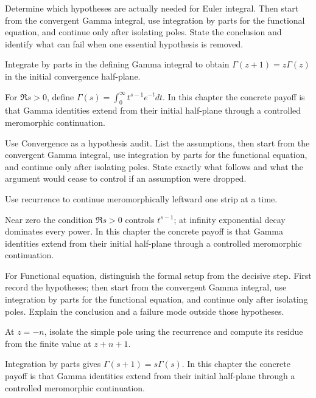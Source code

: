 \begin{exercise}\label{exr:iv19-01}
Determine which hypotheses are actually needed for Euler integral. Then start from the convergent Gamma integral, use integration by parts for the functional equation, and continue only after isolating poles. State the conclusion and identify what can fail when one essential hypothesis is removed.
\end{exercise}
\begin{hint}
Integrate by parts in the defining Gamma integral to obtain \(\Gamma(z+1)=z\Gamma(z)\) in the initial convergence half-plane.
\end{hint}
\begin{solution}
For $\Re s>0$, define $\Gamma(s)=\int_0^\infty t^{s-1}e^{-t}dt$. In this chapter the concrete payoff is that Gamma identities extend from their initial half-plane through a controlled meromorphic continuation.
\end{solution}

\begin{exercise}\label{exr:iv19-02}
Use Convergence as a hypothesis audit. List the assumptions, then start from the convergent Gamma integral, use integration by parts for the functional equation, and continue only after isolating poles. State exactly what follows and what the argument would cease to control if an assumption were dropped.
\end{exercise}
\begin{hint}
Use recurrence to continue meromorphically leftward one strip at a time.
\end{hint}
\begin{solution}
Near zero the condition $\Re s>0$ controls $t^{s-1}$; at infinity exponential decay dominates every power. In this chapter the concrete payoff is that Gamma identities extend from their initial half-plane through a controlled meromorphic continuation.
\end{solution}

\begin{exercise}\label{exr:iv19-03}
For Functional equation, distinguish the formal setup from the decisive step. First record the hypotheses; then start from the convergent Gamma integral, use integration by parts for the functional equation, and continue only after isolating poles. Explain the conclusion and a failure mode outside those hypotheses.
\end{exercise}
\begin{hint}
At \(z=-n\), isolate the simple pole using the recurrence and compute its residue from the finite value at \(z+n+1\).
\end{hint}
\begin{solution}
Integration by parts gives $\Gamma(s+1)=s\Gamma(s)$. In this chapter the concrete payoff is that Gamma identities extend from their initial half-plane through a controlled meromorphic continuation.
\end{solution}

